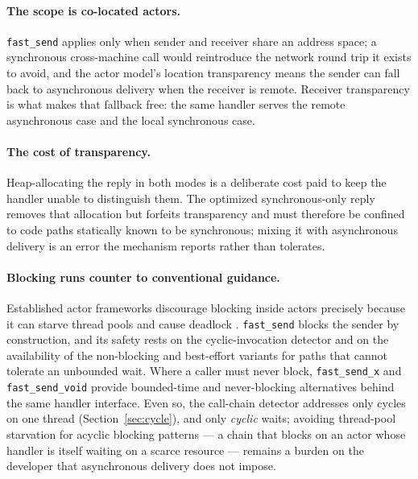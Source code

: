 \documentclass[11pt]{article}
\newcommand{\fs}{\texttt{fast\_send}}
\begin{document}
\paragraph{The scope is co-located actors.} \fs{} applies only when sender and
receiver share an address space; a synchronous cross-machine call would
reintroduce the network round trip it exists to avoid, and the actor model's
location transparency means the sender can fall back to asynchronous delivery
when the receiver is remote. Receiver transparency is what makes that fallback
free: the same handler serves the remote asynchronous case and the local
synchronous case.

\paragraph{The cost of transparency.} Heap-allocating the reply in both modes is
a deliberate cost paid to keep the handler unable to distinguish them. The
optimized synchronous-only reply removes that allocation but forfeits
transparency and must therefore be confined to code paths statically known to be
synchronous; mixing it with asynchronous delivery is an error the mechanism
reports rather than tolerates.

\paragraph{Blocking runs counter to conventional guidance.} Established actor
frameworks discourage blocking inside actors precisely because it can starve
thread pools and cause deadlock \cite{akka,armstrong2003,swift2021}. \fs{}
blocks the sender by construction, and its safety rests on the cyclic-invocation
detector and on the availability of the non-blocking and best-effort variants for
paths that cannot tolerate an unbounded wait. Where a caller must never block,
\texttt{fast\_send\_x} and \texttt{fast\_send\_void} provide bounded-time and
never-blocking alternatives behind the same handler interface. Even so, the
call-chain detector addresses only cycles on one thread
(Section~\ref{sec:cycle}), and only \emph{cyclic} waits; avoiding
thread-pool starvation for acyclic blocking patterns --- a chain that blocks on
an actor whose handler is itself waiting on a scarce resource --- remains a
burden on the developer that asynchronous delivery does not impose.
\end{document}
